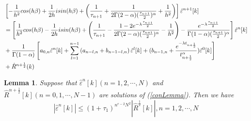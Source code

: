 \documentclass[10pt,a4paper]{amsart}
\newtheorem{lemma}{Lemma}
\begin{document}
\begin{align}
     &\left[-\frac{1}{h^2}cos(h\beta)+\frac{1}{2h}isin(h\beta)+\left(\frac{1}{\tau_{n+1}}+\frac{1}{2\Gamma(2-\alpha)(\frac{\tau_{n+1}}{2})^\alpha}+\frac{1}{h^2}\right) \right]\hat{\varepsilon}^{n+1}[k]\notag \\
    &=\left[\frac{1}{h^2}cos(h\beta)-\frac{1}{2h}isin(h\beta)+\left(\frac{1}{\tau_{n+1}}-\frac{1-2e^{-\lambda \frac{\tau_{n+1}}{2}}}{2\Gamma(2-\alpha)(\frac{\tau_{n+1}}{2})^\alpha}-\frac{1}{h^2}\right) -\frac{e^{-\lambda \frac{\tau_{n+1}}{2}}}{\Gamma(1-\alpha)(\frac{\tau_{n+1}}{2})^\alpha}\right]\hat{\varepsilon}^{n}[k] \notag\\
    &+\frac{1}{\Gamma(1-\alpha)}\left[a_{0, n} \hat{\varepsilon}^{n}[k]+\sum\limits_{l=1}^{n-1} \left(a_{n-l, n}+b_{n-1-l, n}\right) \hat{\varepsilon}^{l}[k]+(b_{n-1, n}+\frac{e^{-\lambda t_{n+\frac{1}{2}}}}{t_{n+\frac{1}{2}}^\alpha}) \hat{\varepsilon}^{0}[k]\right]\notag\\
    &+\hat{R}^{n+\frac{1}{2}}(k) \label{conLemma}
\end{align}

\begin{lemma}\label{convergele}
    Suppose that $\hat{\varepsilon}^n [k] (n = 1,  2, \cdots,  N)$ and $\hat{R}^{n+\frac{1}{2}}[k](n = 0,  1, \cdots,  N-1)$ are solutions of (\ref{conLemma}).  Then we have 
    $$
    |\hat{\varepsilon}^n[k]|\leq (1+\tau_1)^{n^{r-2}N^{2}}|\hat{R}^{\frac{1}{2}}[k]|, n = 1,  2, \cdots,  N$$
\end{lemma}
\end{document}
